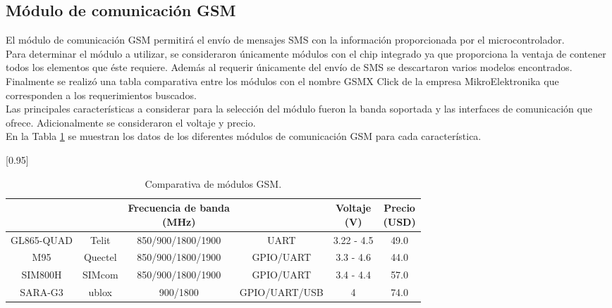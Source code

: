 
\subsection{Módulo de comunicación GSM}
El módulo de comunicación GSM permitirá el envío de mensajes SMS con la información proporcionada por el microcontrolador. \\

Para determinar el módulo a utilizar, se consideraron únicamente módulos con el chip integrado ya que proporciona la ventaja de contener todos los elementos que éste requiere. Además al requerir únicamente del envío de SMS se descartaron varios modelos encontrados. \\

Finalmente se realizó una tabla comparativa entre los módulos con el nombre GSMX Click de la empresa MikroElektronika que corresponden a los requerimientos buscados. \\

Las principales características a considerar para la selección del módulo fueron la banda soportada y las interfaces de comunicación que ofrece. Adicionalmente se consideraron el voltaje y precio. \\

En la Tabla \ref{analisis:moduloGSM} se muestran los datos de los diferentes módulos de comunicación GSM para cada característica.\\

\begin{table}[htbp]
	\begin{center}
		\scalebox{0.93}[0.95]{
		\begin{tabular}{|c|c|c|c|c|c|}
			\hline
			\thead{Modelo}&\thead{Fabricante}&\thead{Frecuencia de banda\\(MHz)}&\thead{Interfaces}&\thead{Voltaje \\ (V)}&\thead{Precio\\(USD)}\\
			\hline
			\hline
			GL865-QUAD & Telit&850/900/1800/1900&UART&3.22 - 4.5&49.0\\
			\hline
			M95 & Quectel&850/900/1800/1900&GPIO/UART&3.3 - 4.6& 44.0\\
			\hline
			SIM800H & SIMcom&850/900/1800/1900&GPIO/UART&3.4 - 4.4&57.0\\
			\hline
			SARA-G3 & ublox&900/1800&GPIO/UART/USB&4&74.0\\
			\hline
		\end{tabular}}
		\caption{Comparativa de módulos GSM.}
		\label{analisis:moduloGSM}
	\end{center}
\end{table}
	
